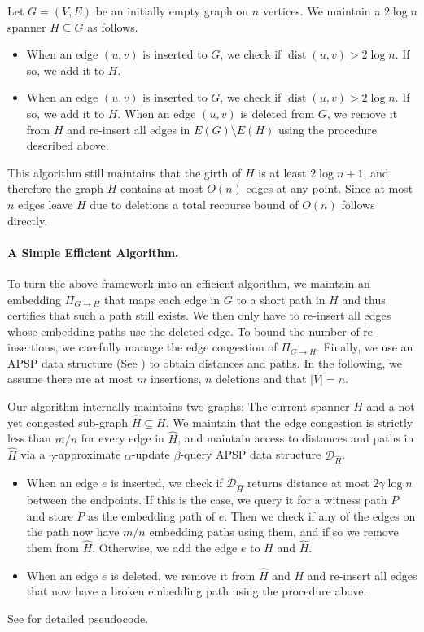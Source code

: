 \documentclass[11pt]{article}
\renewcommand{\hat}{\widehat}
\DeclareMathOperator{\dist}{dist}
\begin{document}
Let $G = (V, E)$ be an initially empty graph on $n$ vertices. We maintain a $2 \log n$ spanner $H \subseteq G$ as follows. 
\begin{itemize}
    \item When an edge $(u,v)$ is inserted to $G$, we check if $\dist(u,v) > 2 \log n$. If so, we add it to $H$.
    \item When an edge $(u,v)$ is inserted to $G$, we check if $\dist(u,v) > 2 \log n$. If so, we add it to $H$. When an edge $(u,v)$ is deleted from $G$, we remove it from $H$ and re-insert all edges in $E(G)\setminus E(H)$ using the procedure described above.
\end{itemize}
This algorithm still maintains that the girth of $H$ is at least $2 \log n + 1$, and therefore the graph $H$ contains at most $O(n)$ edges at any point. Since at most $n$ edges leave $H$ due to deletions a total recourse bound of $O(n)$ follows directly. 

\paragraph{A Simple Efficient Algorithm. } To turn the above framework into an efficient algorithm, we maintain an embedding $\Pi_{G \rightarrow H}$ that maps each edge in $G$ to a short path in $H$ and thus certifies that such a path still exists. We then only have to re-insert all edges whose embedding paths use the deleted edge. To bound the number of re-insertions, we carefully manage the edge congestion of $\Pi_{G \rightarrow H}$. Finally, we use an APSP data structure (See ) to obtain distances and paths. In the following, we assume there are at most $m$ insertions, $n$ deletions and that $|V| = n$.

Our algorithm internally maintains two graphs: The current spanner $H$ and a not yet congested sub-graph $\hat{H} \subseteq H$. We maintain that the edge congestion is strictly less than $m/n$ for every edge in $\hat{H}$, and maintain access to distances and paths in $\hat{H}$ via a $\gamma$-approximate $\alpha$-update $\beta$-query APSP data structure $\mathcal{D}_{\hat{H}}$. 
\begin{itemize}
    \item When an edge $e$ is inserted, we check if $\mathcal{D}_{\hat{H}}$ returns distance at most $2\gamma \log n$ between the endpoints. 
    If this is the case, we query it for a witness path $P$ and store $P$ as the embedding path of $e$. Then we check if any of the edges on the path now have $m/n$ embedding paths using them, and if so we remove them from $\hat{H}$.
Otherwise, we add the edge $e$ to $H$ and $\hat{H}$.
    \item When an edge $e$ is deleted, we remove it from $\hat{H}$ and $H$ and re-insert all edges that now have a broken embedding path using the procedure above. 
\end{itemize}
See  for detailed pseudocode. 
\end{document}
